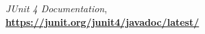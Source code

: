 \begin{thebibliography}{99}
    \emph{JUnit 4 Documentation}, \\
    \href{https://junit.org/junit4/javadoc/latest/}{\textbf{https://junit.org/junit4/javadoc/latest/}}

     
     
     
     
     
     

     
    \end{thebibliography}